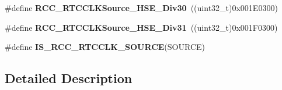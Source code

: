 \begin{DoxyCompactItemize}
\#define {\bfseries R\+C\+C\+\_\+\+R\+T\+C\+C\+L\+K\+Source\+\_\+\+H\+S\+E\+\_\+\+Div30}~((uint32\+\_\+t)0x001\+E0300)
\item 
\mbox{\label{group___r_c_c___r_t_c___clock___source_gab0701b60d52999b20b3d7e52ae452cf0}} 
\#define {\bfseries R\+C\+C\+\_\+\+R\+T\+C\+C\+L\+K\+Source\+\_\+\+H\+S\+E\+\_\+\+Div31}~((uint32\+\_\+t)0x001\+F0300)
\item 
\mbox{\label{group___r_c_c___r_t_c___clock___source_gae76a0340b02b5342e756fa0d2112ebf5}} 
\#define {\bfseries I\+S\+\_\+\+R\+C\+C\+\_\+\+R\+T\+C\+C\+L\+K\+\_\+\+S\+O\+U\+R\+CE}(S\+O\+U\+R\+CE)
\end{DoxyCompactItemize}


\subsection{Detailed Description}
